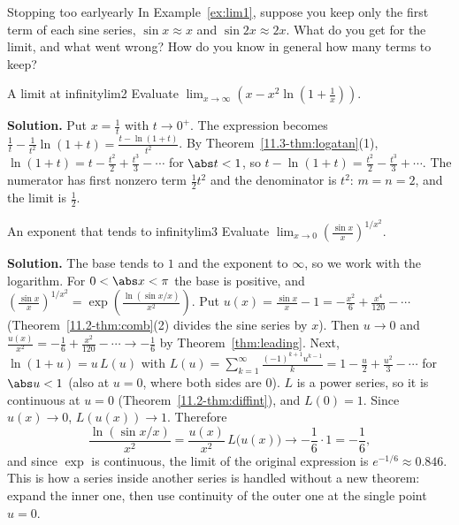 \documentclass[11pt]{article}
\begin{document}
\begin{think}{Stopping too early}{early}
In Example~\ref{ex:lim1}, suppose you keep only the first term of each sine series, $\sin x\approx x$ and $\sin2x\approx2x$. What do you get for the limit, and what went wrong? How do you know in general how many terms to keep?
\end{think}

\begin{exmp}{A limit at infinity}{lim2}
Evaluate $\displaystyle\lim_{x\to\infty}\left(x-x^2\ln\left(1+\frac1x\right)\right)$.

\textbf{Solution.} Put $x=\frac1t$ with $t\to0^+$. The expression becomes $\frac1t-\frac1{t^2}\ln(1+t)=\frac{t-\ln(1+t)}{t^2}$. By Theorem~\ref{11.3-thm:logatan}(1), $\ln(1+t)=t-\frac{t^2}2+\frac{t^3}3-\cdots$ for $\abs t<1$, so $t-\ln(1+t)=\frac{t^2}2-\frac{t^3}3+\cdots$. The numerator has first nonzero term $\frac12t^2$ and the denominator is $t^2$: $m=n=2$, and the limit is $\frac12$.
\end{exmp}

\begin{exmp}{An exponent that tends to infinity}{lim3}
Evaluate $\displaystyle\lim_{x\to0}\left(\frac{\sin x}x\right)^{1/x^2}$.

\textbf{Solution.} The base tends to $1$ and the exponent to $\infty$, so we work with the logarithm. For $0<\abs x<\pi$ the base is positive, and $\left(\frac{\sin x}x\right)^{1/x^2}=\exp\left(\frac{\ln(\sin x/x)}{x^2}\right)$. Put $u(x)=\frac{\sin x}x-1=-\frac{x^2}6+\frac{x^4}{120}-\cdots$ (Theorem~\ref{11.2-thm:comb}(2) divides the sine series by $x$). Then $u\to0$ and $\frac{u(x)}{x^2}=-\frac16+\frac{x^2}{120}-\cdots\to-\frac16$ by Theorem~\ref{thm:leading}. Next, $\ln(1+u)=u\,L(u)$ with $L(u)=\sum_{k=1}^\infty\frac{(-1)^{k+1}u^{k-1}}k=1-\frac u2+\frac{u^2}3-\cdots$ for $\abs u<1$ (also at $u=0$, where both sides are $0$). $L$ is a power series, so it is continuous at $u=0$ (Theorem~\ref{11.2-thm:diffint}), and $L(0)=1$. Since $u(x)\to0$, $L(u(x))\to1$. Therefore
\[
\frac{\ln(\sin x/x)}{x^2}=\frac{u(x)}{x^2}\,L\bigl(u(x)\bigr)\longrightarrow-\frac16\cdot1=-\frac16,
\]
and since $\exp$ is continuous, the limit of the original expression is $e^{-1/6}\approx0.846$.
This is how a series inside another series is handled without a new theorem: expand the inner one, then use continuity of the outer one at the single point $u=0$.
\end{exmp}
\end{document}
